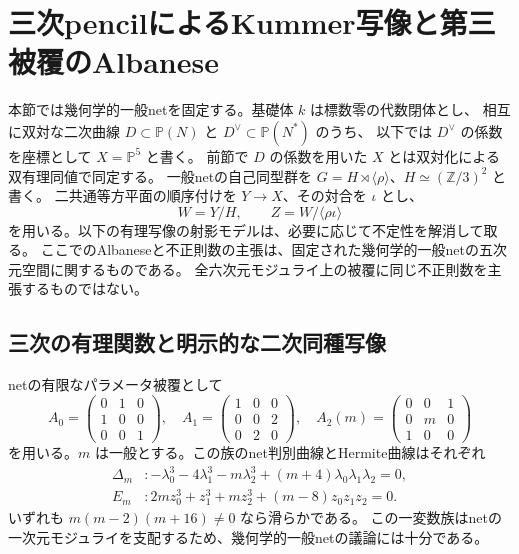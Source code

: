 \section{三次pencilによるKummer写像と第三被覆のAlbanese}
\label{sec:kummer-albanese-v30}

本節では幾何学的一般netを固定する。基礎体 $k$ は標数零の代数閉体とし、
相互に双対な二次曲線 $D\subset\mathbb P(N)$ と $D^\vee\subset\mathbb P(N^*)$ のうち、
以下では $D^\vee$ の係数を座標として $X=\mathbb P^5$ と書く。
前節で $D$ の係数を用いた $X$ とは双対化による双有理同値で同定する。
一般netの自己同型群を
$G=H\rtimes\langle\rho\rangle$、$H\simeq(\mathbb Z/3)^2$ と書く。
二共通等方平面の順序付けを $Y\to X$、その対合を $\iota$ とし、
\[
 W=Y/H,\qquad Z=W/\langle\rho\iota\rangle
\]
を用いる。以下の有理写像の射影モデルは、必要に応じて不定性を解消して取る。
ここでのAlbaneseと不正則数の主張は、固定された幾何学的一般netの五次元空間に関するものである。
全六次元モジュライ上の被覆に同じ不正則数を主張するものではない。

\subsection{三次の有理関数と明示的な二次同種写像}

netの有限なパラメータ被覆として
\begin{equation}\label{eq:net-m-v30}
 A_0=\begin{pmatrix}0&1&0\\1&0&0\\0&0&1\end{pmatrix},\quad
 A_1=\begin{pmatrix}1&0&0\\0&0&2\\0&2&0\end{pmatrix},\quad
 A_2(m)=\begin{pmatrix}0&0&1\\0&m&0\\1&0&0\end{pmatrix}
\end{equation}
を用いる。$m$ は一般とする。この族のnet判別曲線とHermite曲線はそれぞれ
\begin{align}
 \Delta_m &: -\lambda_0^3-4\lambda_1^3-m\lambda_2^3
                  +(m+4)\lambda_0\lambda_1\lambda_2=0,\label{eq:delta-m-v30}\\
 E_m &:2mz_0^3+z_1^3+mz_2^3+(m-8)z_0z_1z_2=0.\label{eq:hermite-m-v30}
\end{align}
いずれも $m(m-2)(m+16)\ne0$ なら滑らかである。
この一変数族はnetの一次元モジュライを支配するため、幾何学的一般netの議論には十分である。

